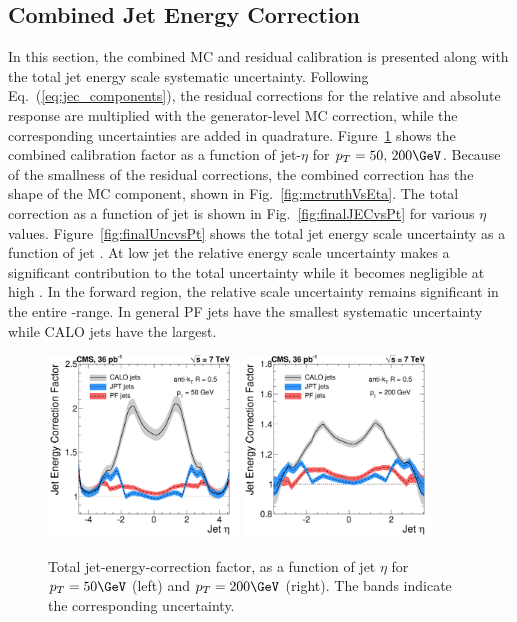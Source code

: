 \subsection{Combined Jet Energy Correction}

In this section, the combined MC and residual calibration is presented along with the total jet energy scale systematic uncertainty. Following Eq.~(\ref{eq:jec_components}), the residual corrections for the relative and absolute response are multiplied with the generator-level MC correction, while the corresponding uncertainties are added in quadrature. Figure~\ref{fig:finalJECvsEta} shows the combined calibration factor as a function of jet-$\eta$ for $\pt=50,\,200\GeV$. Because of the smallness of the residual corrections, the combined correction has the shape of the MC component, shown in Fig.~\ref{fig:mctruthVsEta}. The total correction as a function of jet \pt is shown in Fig.~\ref{fig:finalJECvsPt} for various $\eta$ values. Figure~\ref{fig:finalUncvsPt} shows the total jet energy scale uncertainty as a function of jet \pt. At low jet \pt the relative energy scale uncertainty makes a significant contribution to the total uncertainty while it becomes negligible at high \pt. In the forward region, the relative scale uncertainty remains significant in the entire \pt-range. In general PF jets have the smallest systematic uncertainty while CALO jets have the largest.

\begin{figure}[ht!]
  \begin{center}
    \includegraphics[width=0.45\textwidth]{Figures/JEC/JEC_vs_Eta_CorPt50}
    \includegraphics[width=0.45\textwidth]{Figures/JEC/JEC_vs_Eta_CorPt200}
    \caption{Total jet-energy-correction factor, as a function of jet $\eta$ for $\pt=50\GeV$ (left) and $\pt=200\GeV$ (right). The bands indicate the corresponding uncertainty.}
    \label{fig:finalJECvsEta}
  \end{center}
\end{figure}


